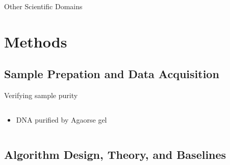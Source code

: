 \documentclass[usenames,dvipsnames]{beamer}
\begin{document}
\begin{frame}{Other Scientific Domains}
\end{frame}


\section{Methods}

\subsection{Sample Prepation and Data Acquisition}

\begin{frame}{Verifying sample purity}

\begin{columns}[T]
\begin{column}{0.6\textwidth}
  \begin{itemize}
  \item DNA purified by Agaorse gel 
  \end{itemize}
\end{column}
\begin{column}{0.4\textwidth}
\end{column}
\end{columns}


\begin{overlayarea}{\textwidth}{\textheight}
\end{overlayarea}

\end{frame}

\subsection{Algorithm Design, Theory, and Baselines}
\end{document}
